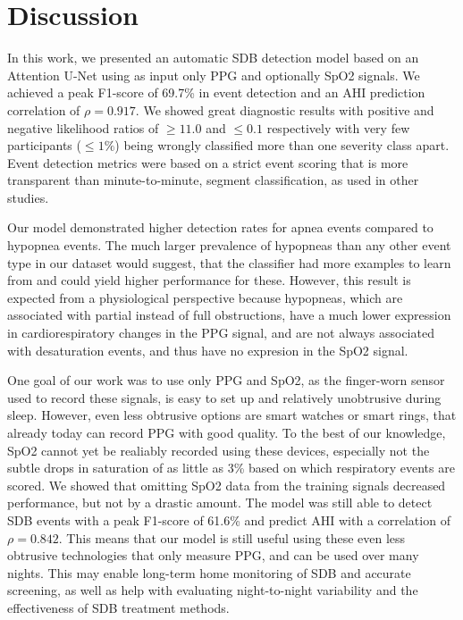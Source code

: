 \chapter{Discussion \label{Chapter-Discussion}}


In this work, we presented an automatic SDB detection model based on an Attention U-Net using as input only PPG and optionally SpO2 signals. We achieved a peak F1-score of 69.7\% in event detection and an AHI prediction correlation of $\rho = 0.917$. We showed great diagnostic results with positive and negative likelihood ratios of $\ge 11.0$ and $\le 0.1$ respectively with very few participants ($\le 1\%$) being wrongly classified more than one severity class apart. Event detection metrics were based on a strict event scoring that is more transparent than minute-to-minute, segment classification, as used in other studies.

Our model demonstrated higher detection rates for apnea events compared to hypopnea events. The much larger prevalence of hypopneas than any other event type in our dataset would suggest, that the classifier had more examples to learn from and could yield higher performance for these. However, this result is expected from a physiological perspective because hypopneas, which are associated with partial instead of full obstructions, have a much lower expression in cardiorespiratory changes in the PPG signal, and are not always associated with desaturation events, and thus have no expresion in the SpO2 signal.

One goal of our work was to use only PPG and SpO2, as the finger-worn sensor used to record these signals, is easy to set up and relatively unobtrusive during sleep. However, even less obtrusive options are smart watches or smart rings, that already today can record PPG with good quality. To the best of our knowledge, SpO2 cannot yet be realiably recorded using these devices, especially not the subtle drops in saturation of as little as 3\% based on which respiratory events are scored. 
We showed that omitting SpO2 data from the training signals decreased performance, but not by a drastic amount. The model was still able to detect SDB events with a peak F1-score of 61.6\% and predict AHI with a correlation of $\rho = 0.842$. This means that our model is still useful using these even less obtrusive technologies that only measure PPG, and can be used over many nights. This may enable long-term home monitoring of SDB and accurate screening, as well as help with evaluating night-to-night variability and the effectiveness of SDB treatment methods.

